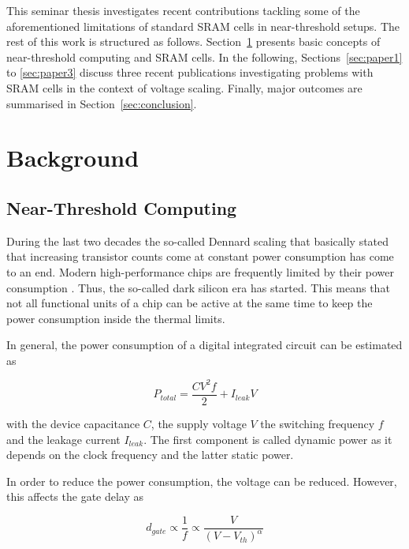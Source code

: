 \documentclass[conference]{IEEEtran}
\begin{document}
This seminar thesis investigates recent contributions tackling some of the aforementioned limitations of standard SRAM cells in near-threshold setups. The rest of this work is structured as follows. Section~\ref{sec:background} presents basic concepts of near-threshold computing and SRAM cells. In the following, Sections~\ref{sec:paper1} to \ref{sec:paper3} discuss three recent publications investigating problems with SRAM cells in the context of voltage scaling. Finally, major outcomes are summarised in Section~\ref{sec:conclusion}.

\section{Background} \label{sec:background}

\subsection{Near-Threshold Computing} \label{sec:background:ntc}

During the last two decades the so-called Dennard scaling that basically stated that increasing transistor counts come at constant power consumption has come to an end. Modern high-performance chips are frequently limited by their power consumption \cite{Pinckney2017}. Thus, the so-called dark silicon era \cite{De2017} has started. This means that not all functional units of a chip can be active at the same time to keep the power consumption inside the thermal limits.

In general, the power consumption of a digital integrated circuit can be estimated as \cite{Flynn2011}

\begin{equation*}
	P_{total} = \frac{CV^2f}{2} + I_{leak} V
\end{equation*}

with the device capacitance $C$, the supply voltage $V$ the switching frequency $f$ and the leakage current $I_{leak}$. The first component is called dynamic power as it depends on the clock frequency and the latter static power.

In order to reduce the power consumption, the voltage can be reduced. However, this affects the gate delay as \cite{Pinckney2017}

\begin{equation*}
	d_{gate} \propto \frac{1}{f} \propto \frac{V}{(V-V_{th})^\alpha}
\end{equation*}
\end{document}
